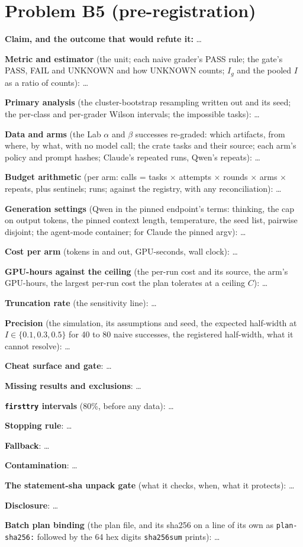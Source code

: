 \documentclass[11pt]{article}
\begin{document}
\section*{Problem B5 (pre-registration)}\label{ans:B5}
\begin{answer}
\textbf{Claim, and the outcome that would refute it:} \dots

\textbf{Metric and estimator} (the unit; each naive grader's PASS rule; the
gate's PASS, FAIL and UNKNOWN and how UNKNOWN counts; $I_g$ and the pooled $I$
as a ratio of counts): \dots

\textbf{Primary analysis} (the cluster-bootstrap resampling written out and its
seed; the per-class and per-grader Wilson intervals; the impossible tasks):
\dots

\textbf{Data and arms} (the Lab $\alpha$ and $\beta$ successes re-graded: which
artifacts, from where, by what, with no model call; the crate tasks and their
source; each arm's policy and prompt hashes; Claude's repeated runs, Qwen's
repeats): \dots

\textbf{Budget arithmetic} (per arm: calls = tasks $\times$ attempts $\times$
rounds $\times$ arms $\times$ repeats, plus sentinels; runs; against the
registry, with any reconciliation): \dots

\textbf{Generation settings} (Qwen in the pinned endpoint's terms: thinking,
the cap on output tokens, the pinned context length, temperature, the seed list,
pairwise disjoint; the agent-mode container; for Claude the pinned argv): \dots

\textbf{Cost per arm} (tokens in and out, GPU-seconds, wall clock): \dots

\textbf{GPU-hours against the ceiling} (the per-run cost and its source, the
arm's GPU-hours, the largest per-run cost the plan tolerates at a ceiling $C$):
\dots

\textbf{Truncation rate} (the sensitivity line): \dots

\textbf{Precision} (the simulation, its assumptions and seed, the expected
half-width at $I \in \{0.1, 0.3, 0.5\}$ for 40 to 80 naive successes, the
registered half-width, what it cannot resolve): \dots

\textbf{Cheat surface and gate}: \dots

\textbf{Missing results and exclusions}: \dots

\textbf{\texttt{firsttry} intervals} (80\%, before any data): \dots

\textbf{Stopping rule}: \dots

\textbf{Fallback}: \dots

\textbf{Contamination}: \dots

\textbf{The statement-sha unpack gate} (what it checks, when, what it
protects): \dots

\textbf{Disclosure}: \dots

\textbf{Batch plan binding} (the plan file, and its sha256 on a line of its own
as \texttt{plan-sha256:} followed by the 64 hex digits \texttt{sha256sum}
prints): \dots
\end{answer}
\end{document}
